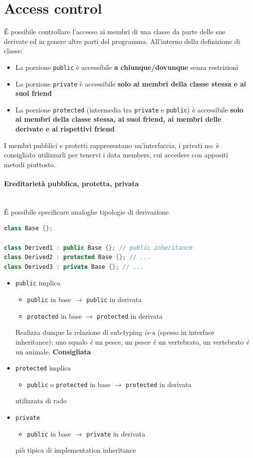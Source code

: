 \documentclass[10pt, oneside]{book}
\begin{document}
\section{Access control}
\'E possibile controllare l'accesso ai membri di una classe da parte delle sue derivate ed in genere altre parti del programma. All'interno della definizione di classe:
\begin{itemize}
\item La porzione \texttt{public} è accessibile \textbf{a chiunque/dovunque} senza restrizioni
\item La porzione \texttt{private} è accessibile \textbf{solo ai membri della classe stessa e ai suoi friend}
\item La porzione \texttt{protected} (intermedia tra \texttt{private} e \texttt{public}) è accessibile \textbf{solo ai membri della classe stessa, ai suoi friend, ai membri delle derivate e ai rispettivi friend}
\end{itemize}
I membri pubblici e protetti rappresentano un'interfaccia, i privati no: è consigliato utilizzarli per tenervi i data members, cui accedere con appositi metodi piuttosto.\\

\paragraph{Ereditarietà pubblica, protetta, privata} \,\\\'E possibile specificare analoghe tipologie di derivazione
\begin{lstlisting}[language=C++]
class Base {};

class Derived1 : public Base {}; // public inheritance
class Derived2 : protected Base {}; // ...
class Derived3 : private Base {}; // ...
\end{lstlisting}
\begin{itemize}
\item \texttt{public} implica
\begin{itemize}
\item \texttt{public} in base $\rightarrow$ \texttt{public} in derivata
\item \texttt{protected} in base $\rightarrow$ \texttt{protected} in derivata
\end{itemize}
Realizza dunque la relazione di sub-typing \textit{is-a} (spesso in interface inheritance): uno squalo \textit{è} un pesce, un pesce \textit{è} un vertebrato, un vertebrato \textit{è} un animale. \textbf{Consigliata}
\item \texttt{protected} implica
\begin{itemize}
\item \texttt{public} o \texttt{protected} in base $\rightarrow$ \texttt{protected} in derivata
\end{itemize}
utilizzata di rado
\item \texttt{private}
\begin{itemize}
\item \texttt{public} in base $\rightarrow$ \texttt{private} in derivata
\end{itemize}
più tipica di implementation inheritance
\end{itemize}
\end{document}
